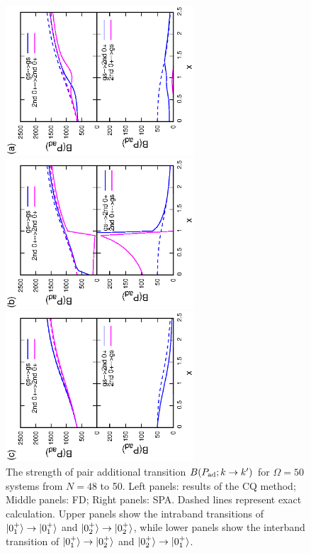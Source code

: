 \documentclass[11pt]{book} %
\begin{document}
\begin{figure}[t]
 \begin{minipage}{0.3\hsize}
 \begin{center}
  \includegraphics[width=70mm,angle=-90]{images/N50Pad_CQ.eps}
 \end{center}
 \captionsetup{labelformat=empty,labelsep=none}
 \end{minipage}
 \begin{minipage}{0.3\hsize}
 \begin{center}
  \includegraphics[width=70mm,angle=-90]{images/N50Pad_FD.eps}
 \end{center}
 \captionsetup{labelformat=empty,labelsep=none}
 \end{minipage}
 \begin{minipage}{0.3\hsize}
 \begin{center}
  \includegraphics[width=70mm,angle=-90]{images/N50Pad_SPA.eps}
 \end{center}
 \captionsetup{labelformat=empty,labelsep=none}
 \end{minipage}
 \caption{The strength of pair additional transition
$B(P_{\rm ad};k\rightarrow k')$ for $\Omega=50$ systems
from $N=48$ to 50.
Left panels: results of the CQ method; Middle panels: FD; Right panels: SPA.
Dashed lines represent exact calculation.
Upper panels show the intraband transitions of
$\ket{0_1^+}\to\ket{0_1^+}$ and $\ket{0_2^+}\to\ket{0_2^+}$,
while lower panels show the interband transition of
$\ket{0_1^+}\to\ket{0_2^+}$ and $\ket{0_2^+}\to\ket{0_1^+}$.
}
 \label{fig:N50Pad}
\end{figure}
\end{document}
